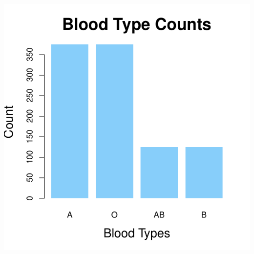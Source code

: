 \documentclass[aspectratio=169]{beamer}
\theoremstyle{principle}
\begin{document}
\begin{frame}
\begin{columns}
\begin{column}{0.5\textwidth}
\includegraphics[scale=0.5]{bar_chart.pdf}
\end{column}

\end{columns}

\end{frame}
\end{document}
